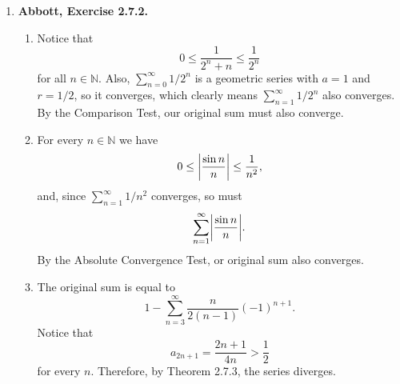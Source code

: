 \documentclass{article}
\DeclarePairedDelimiter\abs{\lvert}{\rvert}
\newcommand{\N}{\mathbb{N}}
\newcommand{\exc}[2][Abbott]{\item \textbf{#1, Exercise #2.}}
\newcommand{\lep}[1][L]{#1et $\epsilon > 0$ be arbitrary}
\begin{document}
\begin{enumerate}
\begin{enumerate}
        
        \item It is easy to see with induction that $a_1 \geq S_n \geq 0$ for all $n \in \N$. Since $S_{2n}$ is increasing and bounded above by $a_1$, the Monotone Convergence Theorem guarantees its convergence. Also, ${S_{2n-1}}$ is decreasing and bounded below by $0$, so it must also converge. Now, we show that $(S_{2n})$ and $(S_{2n-1})$ are equivalent (Definition \ref{def_equivSequences}). \lep. Choose $N \in N$ such that $\abs*{a_n} < \epsilon$ for all $n \geq N$. Then, $\abs*{S_{2n}-S_{2n-1}} = \abs*{a_{2n}} \leq \abs*{a_n} < \epsilon$ for all $n \geq N$, so the sequences are equivalent. By Lemma \ref{lem_equivCauchySequences}, they must converge to the same real number $a$, and we've already shown in Exercise 2.3.5 that this means $(S_n) \to a$ as well, since $(S_n)$ is the shuffled sequence of $(S_{2n-1})$ and $(S_{2n})$. 
    \end{enumerate}
    
    \exc{2.7.2}
    \begin{enumerate}
        \item Notice that 
        \begin{equation*}
            0 \leq \frac{1}{2^n+n} \leq \frac{1}{2^n}
        \end{equation*} for all $n \in \N$. Also, $\sum_{n=0}^\infty 1/2^n$ is a geometric series with $a = 1$ and $r = 1/2$, so it converges, which clearly means $\sum_{n=1}^\infty 1/2^n$ also converges. By the Comparison Test, our original sum must also converge.
        
        \item For every $n \in \N$ we have 
        \begin{equation*}
            0 \leq \abs*{\frac{\sin{n}}{n}} \leq \frac{1}{n^2},
        \end{equation*} and, since $\sum_{n=1}^\infty 1/n^2$ converges, so must 
        \begin{equation*}
            \sum_{n=1}^\infty \abs*{\frac{\sin{n}}{n}}.
        \end{equation*} By the Absolute Convergence Test, or original sum also converges.
        
        \item The original sum is equal to 
        \begin{equation*}
            1 - \sum_{n=3}^\infty \frac{n}{2(n-1)} (-1)^{n+1}.
        \end{equation*} Notice that 
        \begin{equation*}
            a_{2n+1} = \frac{2n+1}{4n} > \frac{1}{2}
        \end{equation*} for every $n$. Therefore, by Theorem 2.7.3, the series diverges.
        

\end{enumerate}
\end{enumerate}
\end{document}
